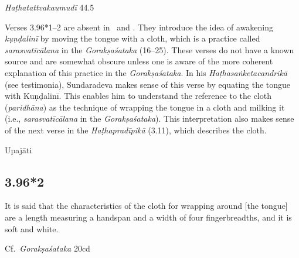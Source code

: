 \begin{ekdosis}
\begin{testimonia}[hp03_096_1]
\emph{Haṭhatattvakaumudī} 44.5
\begin{versinnote}
\end{versinnote}
\end{testimonia}

\begin{philcomm}[hp03_096_1]
Verses 3.96*1–2 are absent in \alphaTwo\ and \alphaThree. 
They introduce the idea of awakening \emph{kụṇḍalinī} by moving the tongue with a cloth, which is a practice called \emph{sarasvatīcālana} in the \emph{Gorakṣaśataka} (16–25). These verses do not have a known source and are somewhat obscure unless one is aware of the more coherent explanation of this practice in the \emph{Gorakṣaśataka}. In his \emph{Haṭhasaṅketacandrikā} (see testimonia), Sundaradeva makes sense of this verse by equating the tongue with Kuṇḍalinī. This enables him to understand the reference to the cloth (\emph{paridhāna}) as the technique of wrapping the tongue in a cloth and milking it (i.e., \emph{sarasvatīcālana} in the \emph{Gorakṣaśataka}). This interpretation also makes sense of the next verse in the \emph{Haṭhapradīpikā} (3.11), which describes the cloth.

\end{philcomm}

\begin{metre}[hp03_096_1]
Upajāti
\end{metre}

\subsection*{3.96*2}
\begin{translation}[hp03_096_2]
It is said that the characteristics of the cloth for wrapping around [the tongue] are a length measuring a handspan and a width of four fingerbreadths, and it is soft and white.
\end{translation}

\begin{sources}[hp03_096_2]
Cf.~\emph{Gorakṣaśataka} 20cd
\begin{versinnote}
\end{versinnote}
\end{sources}


\end{ekdosis}
